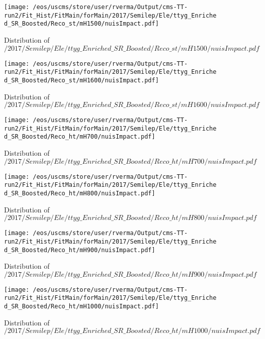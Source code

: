 \begin{figure}
\centering
\texttt{[image: /eos/uscms/store/user/rverma/Output/cms-TT-run2/Fit\_Hist/FitMain/forMain/2017/Semilep/Ele/ttyg\_Enriched\_SR\_Boosted/Reco\_st/mH1500/nuisImpact.pdf]}
\caption{Distribution of $/2017/Semilep/Ele/ttyg\_Enriched\_SR\_Boosted/Reco\_st/mH1500/nuisImpact.pdf$}
\end{figure}

\begin{figure}
\centering
\texttt{[image: /eos/uscms/store/user/rverma/Output/cms-TT-run2/Fit\_Hist/FitMain/forMain/2017/Semilep/Ele/ttyg\_Enriched\_SR\_Boosted/Reco\_st/mH1600/nuisImpact.pdf]}
\caption{Distribution of $/2017/Semilep/Ele/ttyg\_Enriched\_SR\_Boosted/Reco\_st/mH1600/nuisImpact.pdf$}
\end{figure}

\begin{figure}
\centering
\texttt{[image: /eos/uscms/store/user/rverma/Output/cms-TT-run2/Fit\_Hist/FitMain/forMain/2017/Semilep/Ele/ttyg\_Enriched\_SR\_Boosted/Reco\_ht/mH700/nuisImpact.pdf]}
\caption{Distribution of $/2017/Semilep/Ele/ttyg\_Enriched\_SR\_Boosted/Reco\_ht/mH700/nuisImpact.pdf$}
\end{figure}

\begin{figure}
\centering
\texttt{[image: /eos/uscms/store/user/rverma/Output/cms-TT-run2/Fit\_Hist/FitMain/forMain/2017/Semilep/Ele/ttyg\_Enriched\_SR\_Boosted/Reco\_ht/mH800/nuisImpact.pdf]}
\caption{Distribution of $/2017/Semilep/Ele/ttyg\_Enriched\_SR\_Boosted/Reco\_ht/mH800/nuisImpact.pdf$}
\end{figure}

\begin{figure}
\centering
\texttt{[image: /eos/uscms/store/user/rverma/Output/cms-TT-run2/Fit\_Hist/FitMain/forMain/2017/Semilep/Ele/ttyg\_Enriched\_SR\_Boosted/Reco\_ht/mH900/nuisImpact.pdf]}
\caption{Distribution of $/2017/Semilep/Ele/ttyg\_Enriched\_SR\_Boosted/Reco\_ht/mH900/nuisImpact.pdf$}
\end{figure}

\begin{figure}
\centering
\texttt{[image: /eos/uscms/store/user/rverma/Output/cms-TT-run2/Fit\_Hist/FitMain/forMain/2017/Semilep/Ele/ttyg\_Enriched\_SR\_Boosted/Reco\_ht/mH1000/nuisImpact.pdf]}
\caption{Distribution of $/2017/Semilep/Ele/ttyg\_Enriched\_SR\_Boosted/Reco\_ht/mH1000/nuisImpact.pdf$}
\end{figure}


